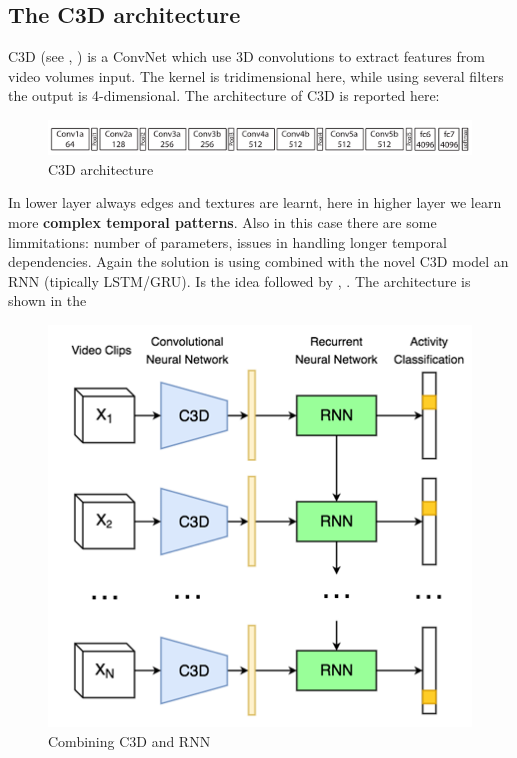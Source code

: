 \subsection{\textsf{The C3D architecture}}
C3D (see \citeauthor{c3d}, \cite{c3d}) is a ConvNet which use 3D convolutions to extract features from video volumes input. The kernel is tridimensional here, while using several filters the output is 4-dimensional. 
The architecture of C3D is reported here: 
\begin{figure}[h]
    \centering
    \includegraphics[scale=0.7]{img/c3d.png}
    \caption{C3D architecture}    
\end{figure}
In lower layer always edges and textures are learnt, here in higher layer  we learn more \textbf{complex temporal patterns}. Also in this case there are some limmitations: number of parameters, issues in handling longer temporal dependencies. Again the solution is using combined with the novel C3D model an RNN (tipically LSTM/GRU). Is the idea followed by \citeauthor{montes2016temporal}, \cite{montes2016temporal}. The architecture is shown in the 

\begin{figure}[h]
    \centering
    \includegraphics[scale=0.8]{img/c3d+rnn.png}
    \caption{Combining C3D and RNN}
    \label{fig:c3drnn}    
\end{figure}


